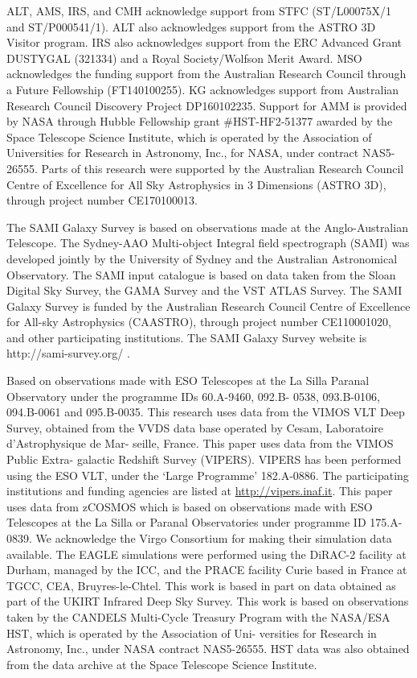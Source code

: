 \documentclass[a4paper,fleqn,usenatbib]{mnras}
\begin{document}
{ALT, AMS, IRS, and CMH acknowledge support from STFC (ST/L00075X/1 and ST/P000541/1). ALT also acknowledges support from the ASTRO 3D Visitor program. IRS also acknowledges support from the ERC Advanced Grant DUSTYGAL (321334) and a Royal Society/Wolfson Merit Award. MSO acknowledges the funding support from the Australian Research Council through a Future Fellowship (FT140100255). KG acknowledges support from Australian Research Council Discovery Project DP160102235. Support for AMM is provided by NASA through Hubble Fellowship grant \#HST-HF2-51377 awarded by the Space Telescope Science Institute, which is operated by the Association of Universities for Research in Astronomy, Inc., for NASA, under contract NAS5-26555. Parts of this research were supported by the Australian Research Council Centre of Excellence for All Sky Astrophysics in 3 Dimensions (ASTRO 3D), through project number CE170100013.

The SAMI Galaxy Survey is based on observations made at the Anglo-Australian Telescope. The Sydney-AAO Multi-object Integral field spectrograph (SAMI) was developed jointly by the University of Sydney and the Australian Astronomical Observatory. The SAMI input catalogue is based on data taken from the Sloan Digital Sky Survey, the GAMA Survey and the VST ATLAS Survey. The SAMI Galaxy Survey is funded by the Australian Research Council Centre of Excellence for All-sky Astrophysics (CAASTRO), through project number CE110001020, and other participating institutions. The SAMI Galaxy Survey website is http://sami-survey.org/ .

Based on observations made with ESO Telescopes at the La Silla Paranal Observatory under the programme IDs 60.A-9460, 092.B- 0538, 093.B-0106, 094.B-0061 and 095.B-0035. This research uses data from the VIMOS VLT Deep Survey, obtained from the VVDS data base operated by Cesam, Laboratoire d’Astrophysique de Mar- seille, France. This paper uses data from the VIMOS Public Extra- galactic Redshift Survey (VIPERS). VIPERS has been performed using the ESO VLT, under the ‘Large Programme’ 182.A-0886. The participating institutions and funding agencies are listed at \url{http://vipers.inaf.it}. This paper uses data from zCOSMOS which is based on observations made with ESO Telescopes at the La Silla or Paranal Observatories under programme ID 175.A-0839. We acknowledge the Virgo Consortium for making their simulation data available. The EAGLE simulations were performed using the DiRAC-2 facility at Durham, managed by the ICC, and the PRACE facility Curie based in France at TGCC, CEA, Bruyres-le-Chtel. This work is based in part on data obtained as part of the UKIRT Infrared Deep Sky Survey. This work is based on observations taken by the CANDELS Multi-Cycle Treasury Program with the NASA/ESA HST, which is operated by the Association of Uni- versities for Research in Astronomy, Inc., under NASA contract NAS5-26555. HST data was also obtained from the data archive at the Space Telescope Science Institute.



}
\end{document}
